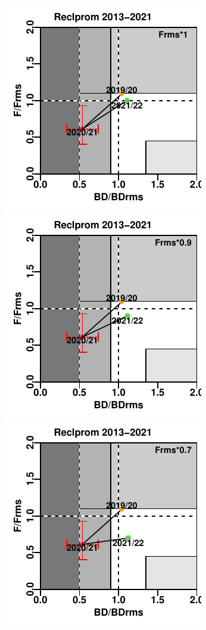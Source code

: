 \documentclass[
  spanish,
]{article}
\begin{document}
\includegraphics{FigurasInforme_Marzo/Fig45c_marzo-1.pdf}
\includegraphics{FigurasInforme_Marzo/Fig45c_marzo-2.pdf}
\includegraphics{FigurasInforme_Marzo/Fig45c_marzo-3.pdf}
\end{document}
